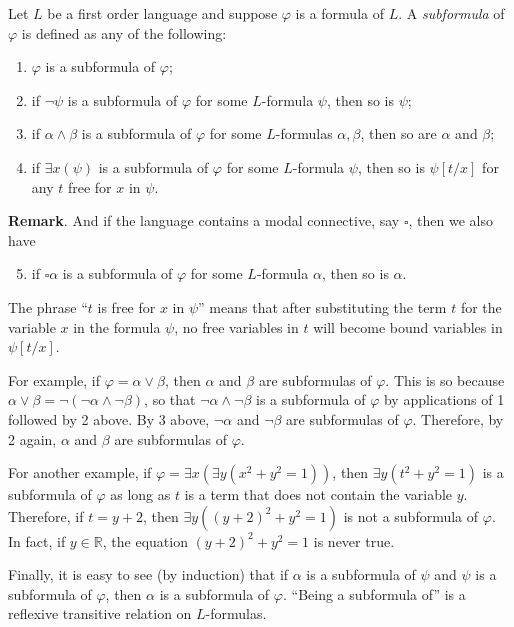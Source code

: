 \documentclass[12pt]{article}
\begin{document}
Let $L$ be a first order language and suppose $\varphi$ is a formula of $L$.  A \emph{subformula} of $\varphi$ is defined as any of the following:
\begin{enumerate}
\item $\varphi$ is a subformula of $\varphi$;
\item if $\neg \psi$ is a subformula of $\varphi$ for some $L$-formula $\psi$, then so is $\psi$;
\item if $\alpha\wedge \beta$ is a subformula of $\varphi$ for some $L$-formulas $\alpha,\beta$, then so are $\alpha$ and $\beta$;
\item if $\exists x (\psi)$ is a subformula of $\varphi$ for some $L$-formula $\psi$, then so is $\psi[t/x]$ for any $t$ free for $x$ in $\psi$. 
\end{enumerate}
\textbf{Remark}.  And if the language contains a modal connective, say $\square$, then we also have
\begin{enumerate}
\setcounter{enumi}{4}
\item if $\square \alpha$ is a subformula of $\varphi$ for some $L$-formula $\alpha$, then so is $\alpha$. 
\end{enumerate}

The phrase ``$t$ is free for $x$ in $\psi$'' means that after substituting the term $t$ for the variable $x$ in the formula $\psi$, no free variables in $t$ will become bound variables in $\psi[t/x]$.  

For example, if $\varphi=\alpha \vee \beta$, then $\alpha$ and $\beta$ are subformulas of $\varphi$.  This is so because  $\alpha\vee \beta = \neg(\neg \alpha \wedge \neg \beta)$, so that $\neg \alpha\wedge \neg\beta$ is a subformula of $\varphi$ by applications of 1 followed by 2 above.  By 3 above, $\neg \alpha$ and $\neg \beta$ are subformulas of $\varphi$.  Therefore, by 2 again, $\alpha$ and $\beta$ are subformulas of $\varphi$.

For another example, if $\varphi=\exists x (\exists y (x^2+y^2=1))$, then $\exists y (t^2+y^2=1)$ is a subformula of $\varphi$ as long as $t$ is a term that does not contain the variable $y$.  Therefore, if $t=y+2$, then $\exists y ((y+2)^2+y^2=1)$ is not a subformula of $\varphi$.  In fact, if $y\in \mathbb{R}$, the equation $(y+2)^2+y^2=1$ is never true.

Finally, it is easy to see (by induction) that if $\alpha$ is a subformula of $\psi$ and $\psi$ is a subformula of $\varphi$, then $\alpha$ is a subformula of $\varphi$.  ``Being a subformula of'' is a reflexive transitive relation on $L$-formulas.
\end{document}
